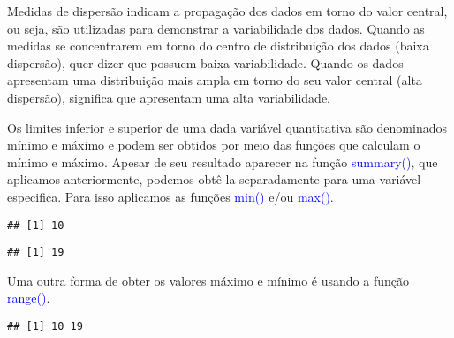 \documentclass[14pt,titlepage, oneside, openany, a4paper]{book}
\newenvironment{Shaded}{\begin{snugshade}}{\end{snugshade}}
\newcommand{\KeywordTok}[1]{\textcolor[rgb]{0.13,0.29,0.53}{\textbf{#1}}}
\newcommand{\NormalTok}[1]{#1}
\newcommand{\OperatorTok}[1]{\textcolor[rgb]{0.81,0.36,0.00}{\textbf{#1}}}
\begin{document}
Medidas de dispersão indicam a propagação dos dados em torno do valor central, ou seja, são utilizadas para demonstrar a variabilidade dos dados. Quando as medidas se concentrarem em torno do centro de distribuição dos dados (baixa dispersão), quer dizer que possuem baixa variabilidade. Quando os dados apresentam uma distribuição mais ampla em torno do seu valor central (alta dispersão), significa que apresentam uma alta variabilidade.

Os limites inferior e superior de uma dada variável quantitativa são denominados mínimo e máximo e podem ser obtidos por meio das funções que calculam o mínimo e máximo. Apesar de seu resultado aparecer na função \textcolor{blue}{summary()}, que aplicamos anteriormente, podemos obtê-la separadamente para uma variável especifica. Para isso aplicamos as funções \textcolor{blue}{min()} e/ou \textcolor{blue}{max()}.

\begin{Shaded}
\end{Shaded}

\begin{verbatim}
## [1] 10
\end{verbatim}

\begin{Shaded}
\end{Shaded}

\begin{verbatim}
## [1] 19
\end{verbatim}

Uma outra forma de obter os valores máximo e mínimo é usando a função \textcolor{blue}{range()}.

\begin{Shaded}
\end{Shaded}

\begin{verbatim}
## [1] 10 19
\end{verbatim}
\end{document}
